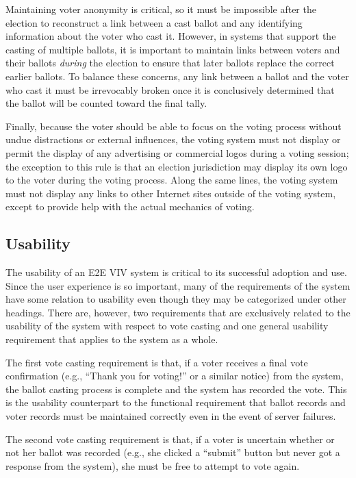 Maintaining voter anonymity is critical, so it must be impossible
after the election to reconstruct a link between a cast ballot and any
identifying information about the voter who cast it. However, in
systems that support the casting of multiple ballots, it is important
to maintain links between voters and their ballots \emph{during} the
election to ensure that later ballots replace the correct earlier
ballots. To balance these concerns, any link between a ballot and the
voter who cast it must be irrevocably broken once it is conclusively
determined that the ballot will be counted toward the final tally.

Finally, because the voter should be able to focus on the voting
process without undue distractions or external influences, the voting
system must not display or permit the display of any advertising or
commercial logos during a voting session; the exception to this rule
is that an election jurisdiction may display its own logo to the voter
during the voting process. Along the same lines, the voting system
must not display any links to other Internet sites outside of the
voting system, except to provide help with the actual mechanics of
voting.

\subsection{Usability}

The usability of an E2E VIV system is critical to its successful
adoption and use. Since the user experience is so important, many of
the requirements of the system have some relation to usability even
though they may be categorized under other headings. There are,
however, two requirements that are exclusively related to the
usability of the system with respect to vote casting and one general
usability requirement that applies to the system as a whole.

The first vote casting requirement is that, if a voter receives a
final vote confirmation (e.g., ``Thank you for voting!'' or a similar
notice) from the system, the ballot casting process is complete and
the system has recorded the vote.  This is the usability counterpart
to the functional requirement that ballot records and voter records
must be maintained correctly even in the event of server failures.

The second vote casting requirement is that, if a voter is uncertain
whether or not her ballot was recorded (e.g., she clicked a ``submit''
button but never got a response from the system), she must be free
to attempt to vote again.

